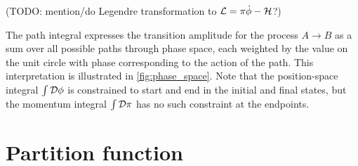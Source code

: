 (TODO: mention/do Legendre transformation to $\mathcal{L} = \pi \dot{\phi} - \mathcal{H}$?)

\iffalse
Note that the combination of the Hamiltonian and the fields in the exponential is precisely the Legendre transformation that converts between the Hamiltonian density $\ham$ and the Lagrangian density $\lagr$.
Thus, we might as well express the transition amplitude as the \textbf{path integral}
\begin{equation}
	\transampl = \int \pathintdif \pi \int_{\phi_A(\vec{x})}^{\phi_B(\vec{x})} \pathintdif \phi \, \exp \big( i S \left[ \pi(\vec{x}, t), \phi(\vec{x}, t) \right] / \hbar \big) ,
\label{eq:tft:path_integral_lagrangian}
\end{equation}
with the action
\begin{equation}
	S \left[ \pi(\vec{x}, t), \phi(\vec{x}, t) \right] = \int_0^T \dif t \int \dif^3 x \, \lagr \left( \pi(\vec{x}, t), \phi(\vec{x}, t) \right) . \qquad \text{TODO: factor $c$?}
\label{eq:tft:action}
\end{equation}
\fi
The path integral expresses the transition amplitude for the process $A \rightarrow B$ as a sum over all possible paths through phase space, each weighted by the value on the unit circle with phase corresponding to the action of the path.
This interpretation is illustrated in \cref{fig:phase_space}.
Note that the position-space integral $\int \mathcal{D} \phi$ is constrained to start and end in the initial and final states, but the momentum integral $\int \mathcal{D} \pi$ has no such constraint at the endpoints.

\section{Partition function}

